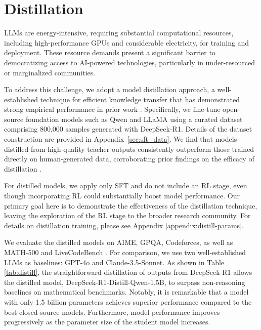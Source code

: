 \section{\dsri{} Distillation}\label{sec:distillation}
LLMs are energy-intensive, requiring substantial computational resources, including high-performance GPUs and considerable electricity, for training and deployment. These resource demands present a significant barrier to democratizing access to AI-powered technologies, particularly in under-resourced or marginalized communities.

To address this challenge, we adopt a model distillation approach, a well-established technique for efficient knowledge transfer that has demonstrated strong empirical performance in prior work \citep{busbridge2025distillation, DBLP:journals/corr/HintonVD15}.
Specifically, we fine-tune open-source foundation models such as Qwen \citep{qwen2_5} and LLaMA \citep{touvron2023llama, llama3_1_405b} using a curated dataset comprising 800,000 samples generated with DeepSeek-R1. Details of the dataset construction are provided in Appendix~\ref{sec:sft_data}. We find that models distilled from high-quality teacher outputs consistently outperform those trained directly on human-generated data, corroborating prior findings on the efficacy of distillation \citep{busbridge2025distillation}.


For distilled models, we apply only SFT and do not include an RL stage, even though incorporating RL could substantially boost model performance. Our primary goal here is to demonstrate the effectiveness of the distillation technique, leaving the exploration of the RL stage to the broader research community. For details on distillation training, please see Appendix \ref{appendix:distill-params}.

\label{sec:distilled_model_evaluation}

We evaluate the distilled models on AIME, GPQA, Codeforces, as well as MATH-500 \citep{lightman2023let} and LiveCodeBench \citep{livecodebench}. For comparison, we use two well-established LLMs as baselines: GPT-4o and Claude-3.5-Sonnet. As shown in Table \ref{tab:distill}, the straightforward distillation of outputs from DeepSeek-R1 allows the distilled model, DeepSeek-R1-Distill-Qwen-1.5B, to surpass non-reasoning baselines on mathematical benchmarks. Notably, it is remarkable that a model with only 1.5 billion parameters achieves superior performance compared to the best closed-source models.
Furthermore, model performance improves progressively as the parameter size of the student model increases.


